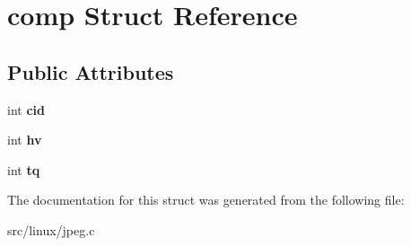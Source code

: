 \hypertarget{structcomp}{\section{comp Struct Reference}
\label{structcomp}
}
\subsection*{Public Attributes}
\begin{DoxyCompactItemize}
\item 
\hypertarget{structcomp_a8a13b7d6171a6411afc68ab9c6cd792d}{int {\bfseries cid}}\label{structcomp_a8a13b7d6171a6411afc68ab9c6cd792d}

\item 
\hypertarget{structcomp_ae9b94231445da3c4fce322ae12cd82a8}{int {\bfseries hv}}\label{structcomp_ae9b94231445da3c4fce322ae12cd82a8}

\item 
\hypertarget{structcomp_a4fb10c419453e686d29787651ba299dc}{int {\bfseries tq}}\label{structcomp_a4fb10c419453e686d29787651ba299dc}

\end{DoxyCompactItemize}


The documentation for this struct was generated from the following file\-:\begin{DoxyCompactItemize}
\item 
src/linux/jpeg.\-c\end{DoxyCompactItemize}
